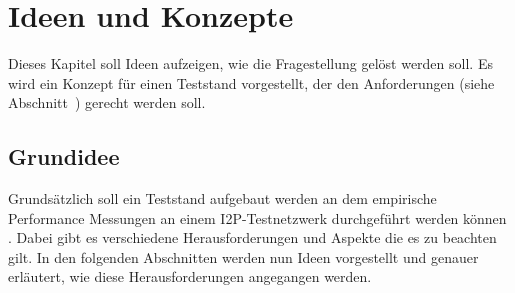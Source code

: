 \chapter{Ideen und Konzepte}
\label{ch:ideen_und_konzepte}

Dieses Kapitel soll Ideen aufzeigen, wie die Fragestellung gelöst werden soll.
Es wird ein Konzept für einen Teststand vorgestellt, der den Anforderungen (siehe Abschnitt~) gerecht werden soll.




\section{Grundidee}\label{sec:grundidee}



Grundsätzlich soll ein Teststand aufgebaut werden an dem empirische Performance Messungen an einem I2P-Testnetzwerk durchgeführt werden können .
Dabei gibt es verschiedene Herausforderungen und Aspekte die es zu beachten gilt.
In den folgenden Abschnitten werden nun Ideen vorgestellt und genauer erläutert, wie diese Herausforderungen angegangen werden.

